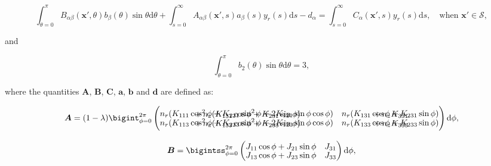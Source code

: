 \documentclass[12pt]{article}
\begin{document}
\begin{equation}
\label{equ:cont_ie_2}
\int_{\theta = 0}^{\pi} B_{\alpha\beta}(\boldsymbol{x'},\theta) b_{\beta}(\theta) \sin \theta \mathrm{d}\theta + \int_{s = 0}^{\infty} A_{\alpha\beta}(\boldsymbol{x'},s) a_{\beta}(s) y_{r}(s) \mathrm{d}s - d_{\alpha} = \int_{s = 0}^{\infty} C_{\alpha}(\boldsymbol{x'},s) y_{r}(s) \mathrm{d}s, \quad \text{when } \boldsymbol{x'} \in \mathcal{S}, 
\end{equation}

and 

\begin{equation}
\label{equ:cont_ie_3}
\int_{\theta = 0}^{\pi} b_{2}(\theta) \sin\theta \mathrm{d}\theta = 3, 
\end{equation}

where the quantities $\boldsymbol{A}$, $\boldsymbol{B}$, $\boldsymbol{C}$, $\boldsymbol{a}$, $\boldsymbol{b}$ and $\boldsymbol{d}$ are defined as:

\begin{equation}
\setlength{\arraycolsep}{5pt}
\renewcommand{\arraystretch}{1.3}
\boldsymbol{A} = (1 - \lambda) \bigint_{\phi = 0}^{2 \pi} \left( \begin{matrix}
   n_{r}(K_{111} \cos^{2}\phi + K_{221} \sin^{2}\phi + 2 K_{121} \sin\phi \cos\phi) &  n_{r}(K_{131} \cos\phi + K_{231} \sin\phi)   \\[-15pt]
{}+n_{z}(K_{131} \cos\phi + K_{231} \sin\phi) & {}+n_{z}K_{331} \\[-5pt]
   n_{r}(K_{113} \cos^{2}\phi + K_{223} \sin^{2}\phi + 2 K_{123} \sin\phi \cos\phi) &   n_{r}(K_{133} \cos\phi + K_{233} \sin\phi)  \\[-15pt]
{}+n_{z}(K_{133} \cos\phi + K_{233} \sin\phi) & {}+n_{z}K_{333} \\
\end{matrix} \right) \mathrm{d}\phi ,
\label{equ:mat_A}
\end{equation}


\begin{equation}
\setlength{\arraycolsep}{5pt}
\renewcommand{\arraystretch}{1.3}
\boldsymbol{B} = \bigintss_{\phi = 0}^{2 \pi} \left( \begin{matrix}
J_{11} \cos\phi + J_{21} \sin\phi & J_{31} \\[-5pt]
J_{13} \cos\phi + J_{23} \sin\phi & J_{33} \\
\end{matrix} \right) \mathrm{d}\phi ,
\label{equ:mat_B}
\end{equation}
\end{document}
